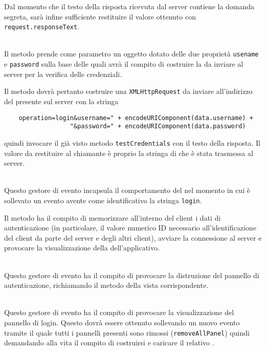 \begin{description}
Dal momento che il testo della risposta ricevuta dal server contiene la domanda segreta, sarà infine sufficiente restituire il valore ottenuto con \verb+request.responseText+.

\item{}\\
Il metodo prende come parametro un oggetto dotato delle due proprietà \verb+usename+ e \verb+password+ sulla base delle quali avrà il compito di costruire la  da inviare al server per la verifica delle credenziali.

Il metodo dovrà pertanto costruire una \verb+XMLHttpRequest+ da inviare all'indirizzo del  presente sul server con la stringa
\begin{verbatim}
    operation=login&username=" + encodeURIComponent(data.username) +
                  "&password=" + encodeURIComponent(data.password)
\end{verbatim}
quindi invocare il già visto metodo \verb+testCredentials+ con il testo della risposta. Il valore da restituire al chiamante è proprio la stringa di  che è stata trasmessa al server.

\item{}\\
Questo gestore di evento incapsula il comportamento del  nel momento in cui è sollevato un evento avente come identificativo la stringa \verb'login'.

Il metodo ha il compito di memorizzare all'interno del client i dati di autenticazione (in particolare, il valore numerico ID necessario all'identificazione del client da parte del server e degli altri client), avviare la connessione al server e provocare la visualizzazione della  dell'applicativo.

\item{}\\
Questo gestore di evento ha il compito di provocare la distruzione del pannello di autenticazione, richiamando il metodo  della vista corrispondente.

\item{}\\
Questo gestore di evento ha il compito di provocare la visualizzazione del pannello di login. Questo dovrà essere ottenuto sollevando un nuovo evento tramite il quale tutti i pannelli presenti sono rimossi (\verb'removeAllPanel') quindi demandando alla vita il compito di costruirsi e caricare il relativo .


\end{description}
